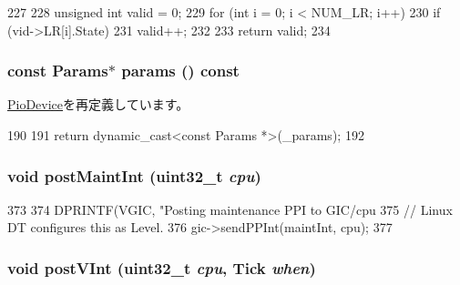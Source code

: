 \begin{DoxyCode}
227     {
228         unsigned int valid = 0;
229         for (int i = 0; i < NUM_LR; i++) {
230             if (vid->LR[i].State)
231                 valid++;
232         }
233         return valid;
234     }
\end{DoxyCode}
\hypertarget{classVGic_acd3c3feb78ae7a8f88fe0f110a718dff}{
\subsubsection[{params}]{\setlength{\rightskip}{0pt plus 5cm}const {\bf Params}$\ast$ params () const}}
\label{classVGic_acd3c3feb78ae7a8f88fe0f110a718dff}


\hyperlink{classPioDevice_acd3c3feb78ae7a8f88fe0f110a718dff}{PioDevice}を再定義しています。


\begin{DoxyCode}
190     {
191         return dynamic_cast<const Params *>(_params);
192     }
\end{DoxyCode}
\hypertarget{classVGic_ad86c8e2cfb589fee04dfc050013963af}{
\subsubsection[{postMaintInt}]{\setlength{\rightskip}{0pt plus 5cm}void postMaintInt ({\bf uint32\_\-t} {\em cpu})}}
\label{classVGic_ad86c8e2cfb589fee04dfc050013963af}



\begin{DoxyCode}
373 {
374     DPRINTF(VGIC, "Posting maintenance PPI to GIC/cpu%
375     // Linux DT configures this as Level.
376     gic->sendPPInt(maintInt, cpu);
377 }
\end{DoxyCode}
\hypertarget{classVGic_a8974d873942f37d74bede520fc0d1f1a}{
\subsubsection[{postVInt}]{\setlength{\rightskip}{0pt plus 5cm}void postVInt ({\bf uint32\_\-t} {\em cpu}, \/  {\bf Tick} {\em when})}}
\label{classVGic_a8974d873942f37d74bede520fc0d1f1a}




